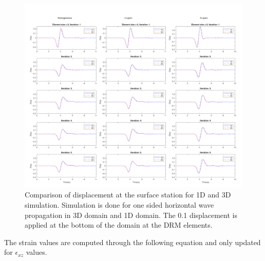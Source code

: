  \begin{figure}[H]
    \centering
    \includegraphics[width=\textwidth]{figures/pdf/comparison_1D_3D_3models_results.pdf}
    \caption{Comparison of displacement at the surface station for 1D and 3D simulation. Simulation is done for one sided horizontal wave propagation in 3D domain and 1D domain. The 0.1 displacement is applied at the bottom of the domain at the DRM elements.}
    \label{fig:comparison_1D_3D_3models_results}
\end{figure}

The strain values are computed through the following equation and only updated for $\epsilon_{xz} $ values.


